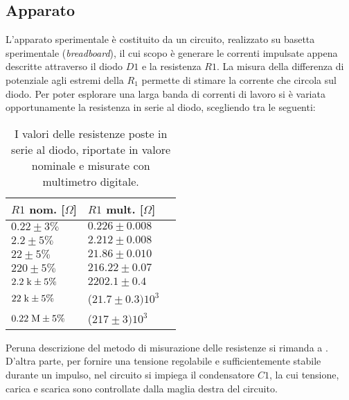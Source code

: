 \documentclass{article}[a4paper, oneside, 11pt]
\begin{document}
\subsection{Apparato}
L'apparato sperimentale è costituito da un circuito, realizzato su basetta 
sperimentale (\emph{breadboard}), il cui scopo è generare le correnti
impulsate appena descritte attraverso il diodo $D1$ e la resistenza $R1$.
La misura della differenza di potenziale agli estremi della $R_1$ permette
di stimare la corrente che circola sul diodo.
Per poter esplorare una larga banda di correnti di lavoro
si è variata opportunamente la resistenza in serie al diodo, scegliendo tra
le seguenti:
\begin{table}[H]%
    \begin{center}
	\begin{tabular}{lll}
	    \toprule
	    $R1$ nom. [$\Omega$] & $R1$ mult. [$\Omega$] \\ 
	    \midrule
	    \midrule
	    $0.22 \pm 3 \% $         	& $0.226 \pm 0.008$ \\
	    $2.2 \pm 5 \% $          	& $2.212 \pm 0.008$ \\
	    $22 \pm 5 \% $           	& $21.86 \pm 0.010$ \\ 
		$220 \pm 5 \% $          	& $216.22 \pm 0.07$ \\
	    $2.2\; \rm k \pm 5 \% $       & $2202.1 \pm 0.4$ \\
	    $22\; \rm k \pm 5 \% $       & ($21.7 \pm 0.3)10^3$ \\
	    $0.22\; \rm M \pm 5 \% $      & ($217 \pm 3)10^3$ \\
	    \bottomrule
	\end{tabular}
	\caption{I valori delle resistenze poste in serie al diodo, riportate in
		valore nominale e misurate con multimetro digitale. \label{tab:res}}
    \end{center}
\end{table}
Peruna descrizione del metodo di misurazione delle resistenze si rimanda a
.
D'altra parte, per fornire una tensione regolabile e sufficientemente stabile
durante un impulso, nel circuito si impiega il condensatore $C1$, la cui
tensione, carica e scarica sono controllate dalla maglia destra del circuito.
\end{document}
